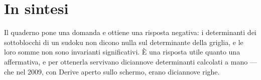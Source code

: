 \section*{In sintesi}

Il quaderno pone una domanda e ottiene una risposta negativa: i determinanti dei sottoblocchi di un sudoku non dicono nulla sul determinante della griglia, e le loro somme non sono invarianti significativi. È una risposta utile quanto una affermativa, e per ottenerla servivano diciannove determinanti calcolati a mano — che nel 2009, con Derive aperto sullo schermo, erano diciannove righe.

